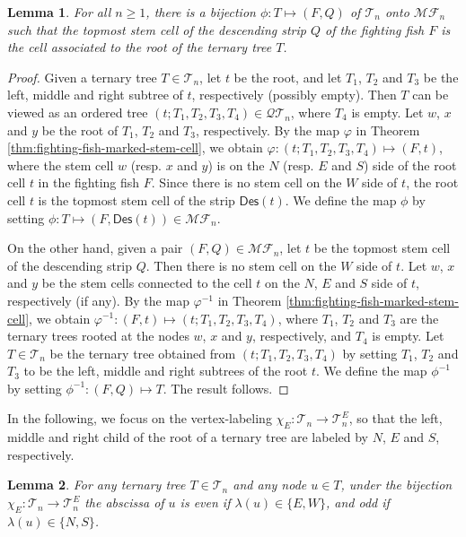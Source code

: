 \documentclass[a4paper,11pt,reqno]{amsart}
\newtheorem{lem}{Lemma}[section]
\theoremstyle{definition}
\numberwithin{equation}{section}
\newcommand{\Des}{{\textsf{Des}}}
\newcommand{\MF}{{\mathcal{MF}}}
\newcommand{\QT}{{\mathcal{QT}}}
\newcommand{\T}{{\mathcal{T}}}
\begin{document}
\begin{lem} \label{lem:the-map-phi}
For all $n\ge 1$, there is a bijection $\phi: T\mapsto (F,Q)$ of $\T_n$ onto $\MF_n$ such that the topmost stem cell of the descending strip $Q$ of the fighting fish $F$ is the cell associated to the root of the ternary tree $T$. 
\end{lem}

\begin{proof}
Given a ternary tree $T\in\T_n$, let $t$ be the root, and let $T_1$, $T_2$ and $T_3$ be the left, middle and right subtree of $t$, respectively (possibly empty). Then $T$ can be viewed as an ordered tree $(t; T_1, T_2, T_3, T_4)\in\QT_n$, where $T_4$ is empty. Let
$w$, $x$ and $y$ be the root of $T_1$, $T_2$ and $T_3$, respectively. By the map $\varphi$ in Theorem \ref{thm:fighting-fish-marked-stem-cell}, we obtain $\varphi:(t; T_1, T_2, T_3, T_4)\mapsto (F,t)$, where the stem cell $w$ (resp. $x$ and $y$) is on the $N$ (resp. $E$ and $S$) side of the root cell $t$ in the fighting fish $F$. Since there is no stem cell on the $W$ side of $t$, the root cell $t$ is the topmost stem cell of the strip $\Des(t)$. We define the map $\phi$ by setting $\phi:T\mapsto (F,\Des(t))\in\MF_n$.



On the other hand, given a pair $(F,Q)\in\MF_n$, let $t$ be the topmost stem cell of the descending strip $Q$. Then there is no stem cell on the $W$ side of $t$.
Let $w$, $x$ and $y$ be the stem cells connected to the cell $t$ on the $N$, $E$ and $S$ side of $t$, respectively (if any). 
By the map $\varphi^{-1}$ in Theorem \ref{thm:fighting-fish-marked-stem-cell}, we obtain $\varphi^{-1}:(F,t)\mapsto (t;T_1,T_2,T_3,T_4)$, where $T_1$, $T_2$ and $T_3$ are the ternary trees rooted at the nodes $w$, $x$ and $y$, respectively, and $T_4$ is empty.
Let $T\in\T_n$ be the ternary tree obtained from $(t;T_1,T_2,T_3,T_4)$ by setting $T_1$, $T_2$ and $T_3$ to be the left, middle and right subtrees of the root $t$. We define the map $\phi^{-1}$ by setting $\phi^{-1}:(F,Q)\mapsto T$.
The result follows.
\end{proof}


In the following, we focus on the vertex-labeling $\chi_E:\T_n\rightarrow\T^E_n$, so that the left, middle and right child of the root of a ternary tree are labeled by $N$, $E$ and $S$, respectively.


\begin{lem} \label{lem:v-labeling-rule} For any ternary tree $T\in\T_n$ and any node $u\in T$, under the bijection $\chi_E:\T_n\rightarrow\T^E_n$ the abscissa of $u$ is even if $\lambda(u)\in\{E,W\}$, and odd if $\lambda(u)\in\{N,S\}$.
\end{lem}
\end{document}
